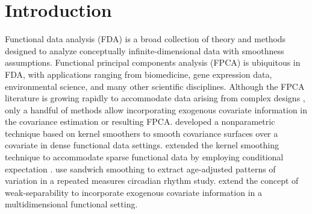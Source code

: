 \documentclass[useAMS,referee,usenatbib]{biom}
\begin{document}

\maketitle


\section{Introduction}
\label{s:intro}
\iffalse
The study investigated investigated peak alpha frequency (PAF), the frequency at which oscillations in the alpha rhythm [6-14 Hz] achieve maximal power and is known to shift from lower to higher frequencies as TD children age. The study found that children with ASD did not show increasing PAF with age. Furthermore, PAF was strongly correlated with non-verbal cognition. In this article we take a broader view and investigate the entire alpha spectrum as opposed to collapsing this information to a single point. EEG signals were recorded using a 128-channel sensor net at 500 Hz. After post-processing the raw EEG data, each child has 25 regions of interest and alpha spectral power captured from 6 to 14 Hz with .25 Hz increments. We propose to treat this data within a functional data framework, whree each spectral power curve is considered one observation. See \cite{Wang2016} for a broad review on functional data analysis (FDA). 
\fi

Functional data analysis (FDA) is a broad collection of theory and methods designed to analyze conceptually infinite-dimensional data with smoothness assumptions. Functional principal components analysis (FPCA) \citep{Wang2016} is ubiquitous in FDA, with applications ranging from biomedicine, gene expression data, environmental science, and many other scientific disciplines. Although the FPCA literature is growing rapidly to accommodate data arising from complex designs \citep{Baladandayuthapani2008, Staicu2010, Greven2010, Zipunnikov2011, Park2015, Scheffler2020}, only a handful of methods allow incorporating exogenous covariate information in the covariance estimation or resulting FPCA.  \cite{Cardot2007} developed a nonparametric technique based on kernel smoothers to smooth covariance surfaces over a covariate in dense functional data settings. \cite{Jiang2010} extended the kernel smoothing technique to accommodate sparse functional data by employing conditional expectation \citet{Yao2005}. \cite{Xiao2015} use sandwich smoothing \citep{Xiao2013} to extract age-adjusted patterns of variation in a repeated measures circadian rhythm study. \cite{Scheffler2020} extend the concept of weak-separability to incorporate exogenous covariate information in a multidimensional functional setting.
\end{document}
